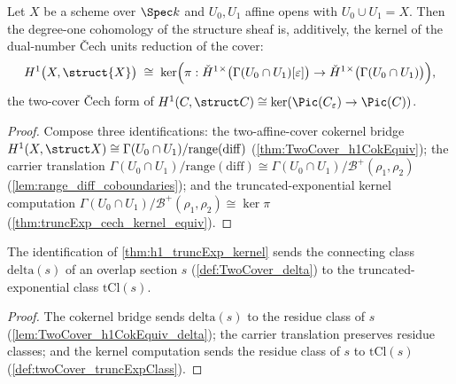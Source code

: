 \begin{theorem}
  \label{thm:h1_truncExp_kernel}
  \leanok
  Let \(X\) be a scheme over \(\Spec k\) and \(U_0, U_1\) affine opens with
  \(U_0 \cup U_1 = X\). Then the degree-one cohomology of the structure sheaf is,
  additively, the kernel of the dual-number \v{C}ech units reduction of the cover:
  \[
    H^1\bigl(X, \struct{X}\bigr) \;\cong\;
    \ker\Bigl( \pi :
      \check H^1{}^\times\bigl(\Gamma(U_0 \cap U_1)[\varepsilon]\bigr) \to
      \check H^1{}^\times\bigl(\Gamma(U_0 \cap U_1)\bigr) \Bigr),
  \]
  the two-cover \v{C}ech form of
  \(H^1(C, \struct C) \cong \ker(\Pic(C_\varepsilon) \to \Pic(C))\).
\end{theorem}
\begin{proof}
  \leanok
  Compose three identifications: the two-affine-cover cokernel bridge
  \(H^1(X, \struct X) \cong \Gamma(U_0 \cap U_1)/\mathrm{range}(\mathrm{diff})\)
  (\ref{thm:TwoCover_h1CokEquiv}); the carrier translation
  \(\Gamma(U_0 \cap U_1)/\mathrm{range}(\mathrm{diff}) \cong
  \Gamma(U_0 \cap U_1)/\mathcal B^+(\rho_1, \rho_2)\)
  (\ref{lem:range_diff_coboundaries}); and the truncated-exponential kernel computation
  \(\Gamma(U_0 \cap U_1)/\mathcal B^+(\rho_1, \rho_2) \cong \ker \pi\)
  (\ref{thm:truncExp_cech_kernel_equiv}).
\end{proof}

\begin{lemma}
  \label{lem:h1_truncExp_kernel_delta}
  \leanok
  The identification of \ref{thm:h1_truncExp_kernel} sends the connecting class
  \(\mathrm{delta}(s)\) of an overlap section \(s\) (\ref{def:TwoCover_delta}) to the
  truncated-exponential class \(\mathrm{tCl}(s)\).
\end{lemma}
\begin{proof}
  \leanok
  The cokernel bridge sends \(\mathrm{delta}(s)\) to the residue class of \(s\)
  (\ref{lem:TwoCover_h1CokEquiv_delta}); the carrier translation preserves residue
  classes; and the kernel computation sends the residue class of \(s\) to
  \(\mathrm{tCl}(s)\) (\ref{def:twoCover_truncExpClass}).
\end{proof}

